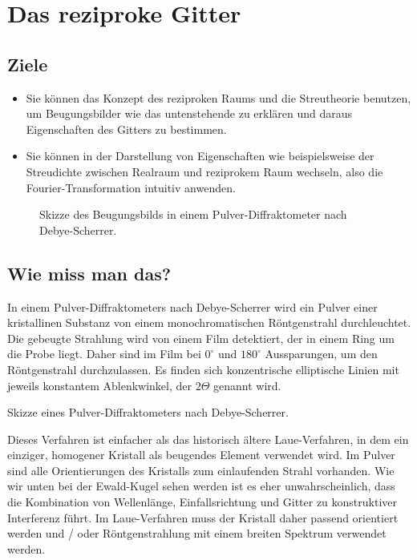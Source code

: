 \renewcommand{\chapterauthors}{Markus Lippitz}
\renewcommand{\lastmod}{27. Januar 2022}


\chapter{Das reziproke Gitter}


\section{Ziele}

\begin{itemize}
\item Sie können das Konzept des reziproken Raums und die Streutheorie benutzen, um Beugungsbilder wie das untenstehende zu erklären und daraus Eigenschaften des Gitters zu bestimmen.

\item Sie können in der Darstellung von Eigenschaften wie beispielsweise der Streudichte zwischen Realraum und reziprokem Raum wechseln, also die Fourier-Transformation intuitiv anwenden.
\end{itemize}


\begin{figure}
  \caption{Skizze des Beugungsbilds in einem Pulver-Diffraktometer nach Debye-Scherrer.}
\end{figure}




\section{Wie miss man das?}

In einem  Pulver-Diffraktometers  nach Debye-Scherrer wird ein Pulver einer kristallinen Substanz von einem monochromatischen Röntgenstrahl durchleuchtet. Die gebeugte Strahlung wird von einem Film detektiert, der in einem Ring um die Probe liegt. Daher sind im Film bei $0^\circ$ und $180^\circ$ Aussparungen, um den Röntgenstrahl durchzulassen. Es finden sich konzentrische elliptische Linien mit jeweils konstantem Ablenkwinkel, der $2\Theta$ genannt wird.

\begin{marginfigure}
  \caption{Skizze  eines Pulver-Diffraktometers nach Debye-Scherrer.}
\end{marginfigure}

Dieses Verfahren ist einfacher als das historisch ältere Laue-Verfahren, in dem ein einziger, homogener Kristall als beugendes Element verwendet wird. Im Pulver sind alle Orientierungen  des Kristalls zum einlaufenden Strahl vorhanden. Wie wir unten bei der Ewald-Kugel sehen werden ist es eher unwahrscheinlich, dass die Kombination von Wellenlänge, Einfallsrichtung und Gitter zu konstruktiver Interferenz führt. Im Laue-Verfahren muss der Kristall daher passend orientiert werden und / oder Röntgenstrahlung mit einem breiten Spektrum verwendet werden.

